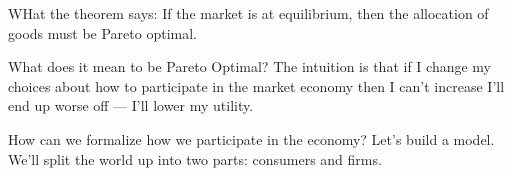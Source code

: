 


WHat the theorem says: If the market is at equilibrium, then the
allocation of goods must be Pareto optimal.


What does it mean to be Pareto Optimal?  The intuition is that if I
change my choices about how to participate in the market economy then
I can't increase I'll end up worse off --- I'll lower my utility.

How can we formalize how we participate in the economy?  Let's build a
model.  We'll split the world up into two parts: consumers and firms.



